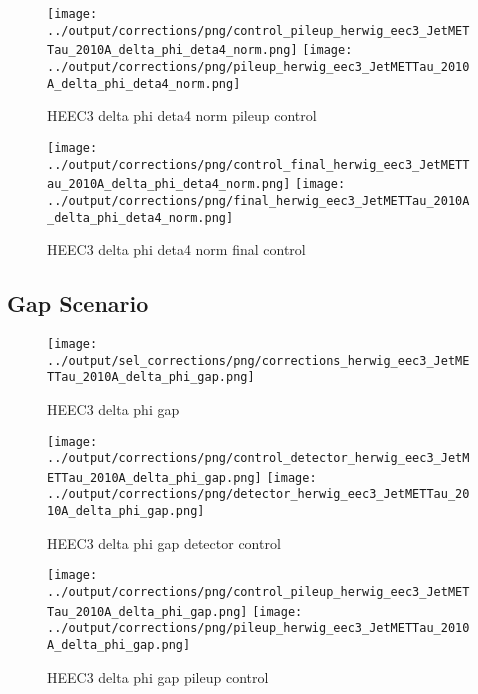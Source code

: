 \documentclass[11pt]{book}
\begin{document}
\begin{figure}[ht]
\centering
\texttt{[image: ../output/corrections/png/control\_pileup\_herwig\_eec3\_JetMETTau\_2010A\_delta\_phi\_deta4\_norm.png]}
\texttt{[image: ../output/corrections/png/pileup\_herwig\_eec3\_JetMETTau\_2010A\_delta\_phi\_deta4\_norm.png]}
\caption{HEEC3 delta phi deta4 norm pileup control}
\label{fig:HEEC3_JetMETTau_2010A_delta_phi_deta4_norm_pileup_control}
\end{figure}


\begin{figure}[ht]
\centering
\texttt{[image: ../output/corrections/png/control\_final\_herwig\_eec3\_JetMETTau\_2010A\_delta\_phi\_deta4\_norm.png]}
\texttt{[image: ../output/corrections/png/final\_herwig\_eec3\_JetMETTau\_2010A\_delta\_phi\_deta4\_norm.png]}
\caption{HEEC3 delta phi deta4 norm final control}
\label{fig:HEEC3_JetMETTau_2010A_delta_phi_deta4_norm_final_control}
\end{figure}

\clearpage
\subsection{Gap Scenario}

\begin{figure}[ht]
\centering
\texttt{[image: ../output/sel\_corrections/png/corrections\_herwig\_eec3\_JetMETTau\_2010A\_delta\_phi\_gap.png]}
\caption{HEEC3 delta phi gap}
\label{fig:HEEC3_JetMETTau_2010A_delta_phi_gap}
\end{figure}


\begin{figure}[ht]
\centering
\texttt{[image: ../output/corrections/png/control\_detector\_herwig\_eec3\_JetMETTau\_2010A\_delta\_phi\_gap.png]}
\texttt{[image: ../output/corrections/png/detector\_herwig\_eec3\_JetMETTau\_2010A\_delta\_phi\_gap.png]}
\caption{HEEC3 delta phi gap detector control}
\label{fig:HEEC3_JetMETTau_2010A_delta_phi_gap_detector_control}
\end{figure}

\begin{figure}[ht]
\centering
\texttt{[image: ../output/corrections/png/control\_pileup\_herwig\_eec3\_JetMETTau\_2010A\_delta\_phi\_gap.png]}
\texttt{[image: ../output/corrections/png/pileup\_herwig\_eec3\_JetMETTau\_2010A\_delta\_phi\_gap.png]}
\caption{HEEC3 delta phi gap pileup control}
\label{fig:HEEC3_JetMETTau_2010A_delta_phi_gap_pileup_control}
\end{figure}
\end{document}
